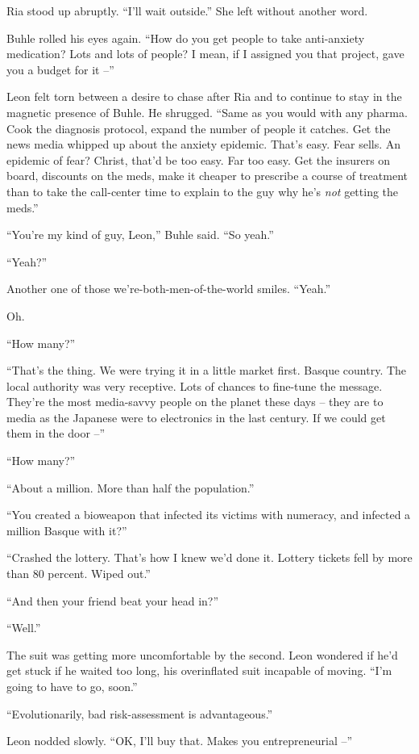 Ria stood up abruptly. “I'll wait outside.” She left without 
another word.

Buhle rolled his eyes again. “How do you get people to take 
anti-anxiety medication? Lots and lots of people? I mean, if I assigned 
you that project, gave you a budget for it --”

Leon felt torn between a desire to chase after Ria and to continue to 
stay in the magnetic presence of Buhle. He shrugged. “Same as you 
would with any pharma. Cook the diagnosis protocol, expand the number 
of people it catches. Get the news media whipped up about the anxiety 
epidemic. That's easy. Fear sells. An epidemic of fear? Christ, that'd 
be too easy. Far too easy. Get the insurers on board, discounts on the 
meds, make it cheaper to prescribe a course of treatment than to take 
the call-center time to explain to the guy why he's \emph{not} getting 
the meds.”

“You're my kind of guy, Leon,” Buhle said. “So yeah.”

“Yeah?”

Another one of those we're-both-men-of-the-world smiles. “Yeah.”

Oh.

“How many?”

“That's the thing. We were trying it in a little market first. Basque 
country. The local authority was very receptive. Lots of chances to 
fine-tune the message. They're the most media-savvy people on the 
planet these days -- they are to media as the Japanese were to 
electronics in the last century. If we could get them in the door --”

“How many?”

“About a million. More than half the population.”

“You created a bioweapon that infected its victims with numeracy, and 
infected a million Basque with it?”

“Crashed the lottery. That's how I knew we'd done it. Lottery tickets 
fell by more than 80 percent. Wiped out.”

“And then your friend beat your head in?”

“Well.”

The suit was getting more uncomfortable by the second. Leon wondered if 
he'd get stuck if he waited too long, his overinflated suit incapable 
of moving. “I'm going to have to go, soon.”

“Evolutionarily, bad risk-assessment is advantageous.”

Leon nodded slowly. “OK, I'll buy that. Makes you entrepreneurial 
--”

